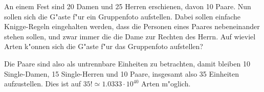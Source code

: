 An einem Fest sind 20 Damen und 25 Herren erschienen, davon
10 Paare. Nun sollen sich die G"aste f"ur ein Gruppenfoto aufstellen.
Dabei sollen einfache Knigge-Regeln eingehalten werden, dass
die Personen eines Paares nebeneinander stehen sollen, und zwar immer
die die Dame zur Rechten des Herrn. Auf wieviel Arten k"onnen sich
die G"aste f"ur das Gruppenfoto aufstellen?

\begin{loesung}
Die Paare sind also als untrennbare Einheiten zu betrachten, damit
bleiben 10 Single-Damen, 15 Single-Herren und 10 Paare,
insgesamt also 35 Einheiten aufzustellen.
Dies ist auf $35!\simeq 1.0333\cdot 10^{40}$ Arten m"oglich.
\end{loesung}


